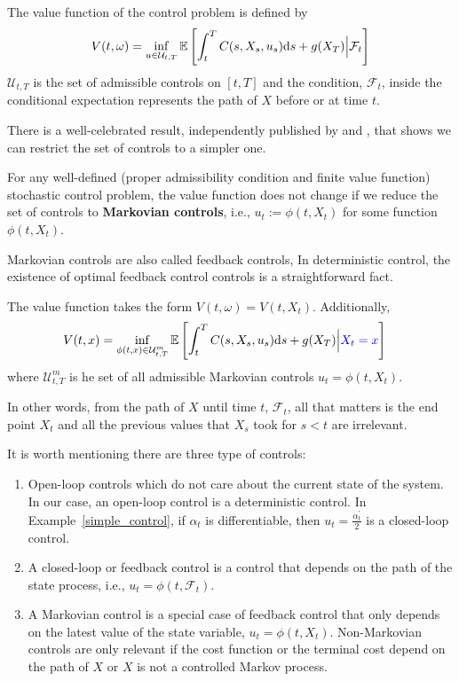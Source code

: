 \documentclass[11pt]{book}
\newcommand{\ds}{\text{\normalfont d}s}
\begin{document}
\begin{defn}
    The value function of the control problem is defined by
\begin{equation}
V(t,\omega)=\inf_{u\in\mathcal{U}_{t,T}}\mathbb{E}\left[\int_{t}^{T}C(s,X_s,u_s){{\ds}}+g(X_T)\Big|\mathcal{F}_t\right]
\end{equation}
$\mathcal{U}_{t,T}$ is the set of admissible controls on $[t,T]$ and the condition, $\mathcal{F}_t$, inside the conditional expectation represents the path of $X$ before or at time $t$.
\end{defn}
There is a well-celebrated result, independently published by \cite{haussmann1986existence} and \cite{el1987compactification}, that shows we can restrict the set of controls to a simpler one. 
\begin{thm}
    For any well-defined (proper admissibility condition and finite value function) stochastic control problem, the value function does not change if we reduce the set of controls to \textbf{Markovian controls}, i.e., $u_t:=\phi(t,X_t)$ for some function $\phi(t,X_t)$. 
\end{thm}
Markovian controls are also called feedback controls, In deterministic control, the existence of optimal feedback control controls is a straightforward fact. 
\begin{coro}\label{coro:Markov_value_function}
   The value function takes the form $V(t,\omega)= V(t,X_t)$. Additionally, 
\begin{equation}\label{eqn:value_function}
\begin{split}
    V(t,x) &=\inf_{\phi(t,x)\in\mathcal{U}^{m}_{t,T}}\mathbb{E}\left[\int_{t}^{T}C(s,X_s,u_s){{\ds}}+g(X_T)\Big|{\color{blue}X_t=x}\right]
\end{split}
\end{equation}
where $\mathcal{U}^{m}_{t,T}$ is he set of all admissible Markovian controls $u_t=\phi(t,X_t)$.
\end{coro}
In other words, from the path of $X$ until time $t$, $\mathcal{F}_t$, all that matters is the end point $X_t$ and all the previous values that $X_s$ took for $s<t$ are irrelevant. 

It is worth mentioning there are three type of controls:
\begin{enumerate}
    \item Open-loop controls which do not care about the current state of the system. In our case, an open-loop control is a deterministic control. In Example~\ref{simple_control}, if $\alpha_t$ is differentiable, then $u_t=\frac{\alpha_t^{\prime}}{2}$ is a closed-loop control. 
    \item A closed-loop or feedback control is a control that depends on the path of the state process, i.e., $u_t = \phi(t,\mathcal{F}_{t})$.
    \item A Markovian control is a special case of feedback control that only depends on the latest value of the state variable, $u_t=\phi(t,X_t)$. Non-Markovian controls are only relevant if the cost function or the terminal cost depend on the path of $X$ or $X$ is not a controlled Markov process.
\end{enumerate}
\end{document}
